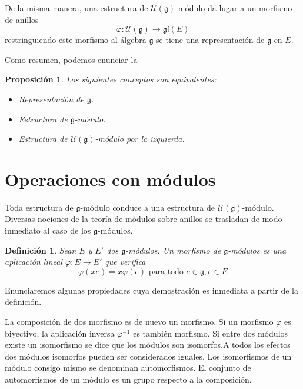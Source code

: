 \documentclass[a4paper,draft,12pt]{article}
\newtheorem{defi}{Definición}[section]%
\newtheorem{propo}[teo]{Proposición}%
\newcommand{\g}{\mathfrak{g}}%
\newcommand{\uni}{\mathcal{U}}%
\newcommand{\lto}{\longrightarrow}%
\newcommand{\df}[1]{\textsf{\color{blue}#1}}
\begin{document}
De la misma manera, una estructura de $\uni(\g)$-módulo da lugar a un morfismo de anillos
$$
\varphi: \uni(\g) \lto \mathfrak{gl}(E)
$$
restringuiendo este morfismo al álgebra $\g$ se tiene una representación de $\g$ en $E$.

Como resumen, podemos enunciar la 

\begin{propo}

Los siguientes conceptos son equivalentes:

\begin{itemize}

\item Representación de $\g$.

\item Estructura de $\g$-módulo.

\item Estructura de $\uni(\g)$-módulo por la izquierda.

\end{itemize}

\end{propo}

\newpage

\section{Operaciones con módulos}

Toda estructura de $\g$-módulo conduce a una estructura de $\uni(\g)$-módulo.  Diversas nociones de la teoría de módulos sobre anillos se trasladan de modo inmediato al caso de los $\g$-módulos.

\begin{defi}

Sean $E$ y $E'$ dos $\g$-módulos. Un  \df{morfismo} \index{morfismo!de $\g$-módulos} de $\g$-módulos es una aplicación lineal $\varphi: E \rightarrow E'$ que verifica
$$
\varphi(xe)=x\varphi(e) \text{ para todo } c \in \g, e \in E
$$

\end{defi}

Enunciaremos algunas propiedades cuya demostración es inmediata a partir de la definición.

La composición de dos morfismo es de nuevo un morfismo.  Si un morfismo $\varphi$ es biyectivo, la aplicación inversa $\varphi^{-1}$ es también morfismo.  Si entre dos módulos existe un  \df{isomorfismo}  se dice que los módulos son isomorfos.A todos los efectos dos módulos isomorfos pueden ser considerados iguales.  Los isomorfismos de un módulo consigo mismo se denominan   \df{automorfismos}.  El conjunto de automorfismos de un módulo es un grupo respecto a la composición.
\end{document}
